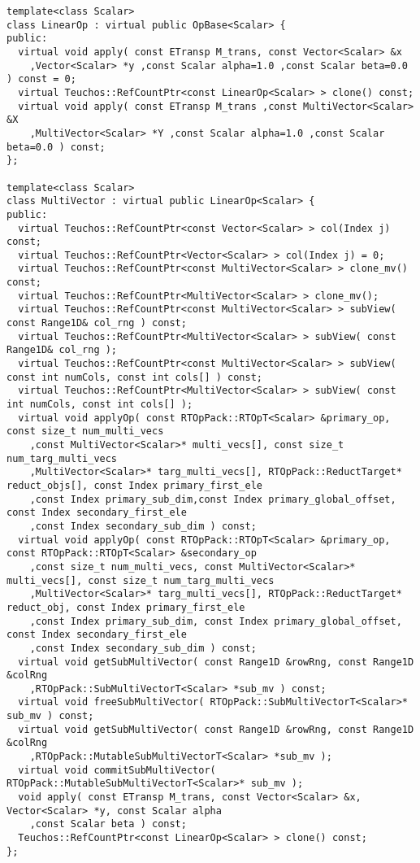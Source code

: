 {\begin{verbatim}
template<class Scalar>
class LinearOp : virtual public OpBase<Scalar> {
public:
  virtual void apply( const ETransp M_trans, const Vector<Scalar> &x
    ,Vector<Scalar> *y ,const Scalar alpha=1.0 ,const Scalar beta=0.0 ) const = 0;
  virtual Teuchos::RefCountPtr<const LinearOp<Scalar> > clone() const;
  virtual void apply( const ETransp M_trans ,const MultiVector<Scalar> &X
    ,MultiVector<Scalar> *Y ,const Scalar alpha=1.0 ,const Scalar beta=0.0 ) const;
};

template<class Scalar>
class MultiVector : virtual public LinearOp<Scalar> {
public:
  virtual Teuchos::RefCountPtr<const Vector<Scalar> > col(Index j) const;
  virtual Teuchos::RefCountPtr<Vector<Scalar> > col(Index j) = 0;
  virtual Teuchos::RefCountPtr<const MultiVector<Scalar> > clone_mv() const;
  virtual Teuchos::RefCountPtr<MultiVector<Scalar> > clone_mv();
  virtual Teuchos::RefCountPtr<const MultiVector<Scalar> > subView( const Range1D& col_rng ) const;
  virtual Teuchos::RefCountPtr<MultiVector<Scalar> > subView( const Range1D& col_rng );
  virtual Teuchos::RefCountPtr<const MultiVector<Scalar> > subView( const int numCols, const int cols[] ) const;
  virtual Teuchos::RefCountPtr<MultiVector<Scalar> > subView( const int numCols, const int cols[] );
  virtual void applyOp( const RTOpPack::RTOpT<Scalar> &primary_op, const size_t num_multi_vecs
    ,const MultiVector<Scalar>* multi_vecs[], const size_t num_targ_multi_vecs
    ,MultiVector<Scalar>* targ_multi_vecs[], RTOpPack::ReductTarget* reduct_objs[], const Index primary_first_ele
    ,const Index primary_sub_dim,const Index primary_global_offset, const Index secondary_first_ele
    ,const Index secondary_sub_dim ) const;
  virtual void applyOp( const RTOpPack::RTOpT<Scalar> &primary_op, const RTOpPack::RTOpT<Scalar> &secondary_op
    ,const size_t num_multi_vecs, const MultiVector<Scalar>* multi_vecs[], const size_t num_targ_multi_vecs
    ,MultiVector<Scalar>* targ_multi_vecs[], RTOpPack::ReductTarget* reduct_obj, const Index primary_first_ele
    ,const Index primary_sub_dim, const Index primary_global_offset, const Index secondary_first_ele
    ,const Index secondary_sub_dim ) const;
  virtual void getSubMultiVector( const Range1D &rowRng, const Range1D &colRng
    ,RTOpPack::SubMultiVectorT<Scalar> *sub_mv ) const;
  virtual void freeSubMultiVector( RTOpPack::SubMultiVectorT<Scalar>* sub_mv ) const;
  virtual void getSubMultiVector( const Range1D &rowRng, const Range1D &colRng
    ,RTOpPack::MutableSubMultiVectorT<Scalar> *sub_mv );
  virtual void commitSubMultiVector( RTOpPack::MutableSubMultiVectorT<Scalar>* sub_mv );
  void apply( const ETransp M_trans, const Vector<Scalar> &x, Vector<Scalar> *y, const Scalar alpha
    ,const Scalar beta ) const;
  Teuchos::RefCountPtr<const LinearOp<Scalar> > clone() const;
};


\end{verbatim}}
